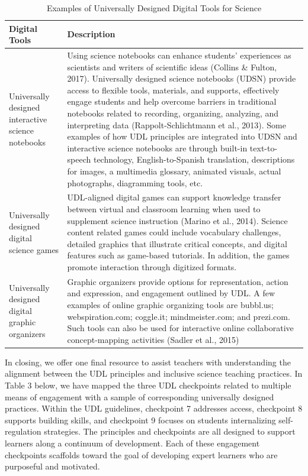 \documentclass[11.5pt]{sig-alternate}
\begin{document}
\begin{large}
\begin{table}
\caption{Examples of Universally Designed Digital Tools for Science}
\begin{tabular}{ll}
\hline
Digital Tools & Description \\ \hline
Universally designed interactive science notebooks & Using science notebooks can enhance students’ experiences as scientists and writers of scientific ideas (Collins \& Fulton, 2017). Universally designed science notebooks (UDSN) provide access to flexible tools, materials, and supports, effectively engage students and help overcome barriers in traditional notebooks related to recording, organizing, analyzing, and interpreting data (Rappolt-Schlichtmann et al., 2013). Some examples of how UDL principles are integrated into UDSN and interactive science notebooks are through built-in text-to-speech technology, English-to-Spanish translation, descriptions for images, a multimedia glossary, animated visuals, actual photographs, diagramming tools, etc. \\ \hline
Universally designed digital science games & UDL-aligned digital games can support knowledge transfer between virtual and classroom learning when used to supplement science instruction (Marino et al., 2014). Science content related games could include vocabulary challenges, detailed graphics that illustrate critical concepts, and digital features such as game-based tutorials. In addition, the games promote interaction through digitized formats. \\ \hline
Universally designed digital graphic organizers & Graphic organizers provide options for representation, action and expression, and engagement outlined by UDL. A few examples of online graphic organizing tools are bubbl.us; webspiration.com; coggle.it; mindmeister.com; and prezi.com. Such tools can also be used for interactive online collaborative concept-mapping activities (Sadler et al., 2015) \\ \hline
\end{tabular}
\end{table}

In closing, we offer one final resource to assist teachers with understanding the alignment between the UDL principles and inclusive science teaching practices. In Table 3 below, we have mapped the three UDL checkpoints related to multiple means of engagement with a sample of corresponding universally designed practices. Within the UDL guidelines, checkpoint 7 addresses access, checkpoint 8 supports building skills, and checkpoint 9 focuses on students internalizing self-regulation strategies. The principles and checkpoints are all designed to support learners along a continuum of development. Each of these engagement checkpoints scaffolds toward the goal of developing expert learners who are purposeful and motivated. 


\end{large}
\end{document}
